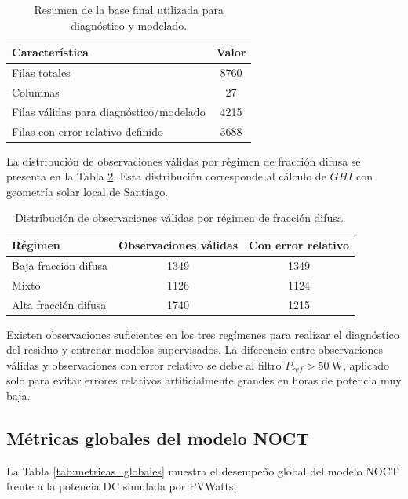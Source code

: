 \documentclass[12pt, letterpaper]{article}
\begin{document}
\begin{table}[H]
\centering
\caption{Resumen de la base final utilizada para diagn\'ostico y modelado.}
\label{tab:base_final}
\begin{tabular}{lc}
\toprule
\textbf{Caracter\'istica} & \textbf{Valor} \\
\midrule
Filas totales & 8760 \\
Columnas & 27 \\
Filas v\'alidas para diagn\'ostico/modelado & 4215 \\
Filas con error relativo definido & 3688 \\
\bottomrule
\end{tabular}
\end{table}

La distribuci\'on de observaciones v\'alidas por r\'egimen de fracci\'on difusa se presenta en la Tabla \ref{tab:regimenes}. Esta distribuci\'on corresponde al c\'alculo de \(GHI\) con geometr\'ia solar local de Santiago.

\begin{table}[H]
\centering
\caption{Distribuci\'on de observaciones v\'alidas por r\'egimen de fracci\'on difusa.}
\label{tab:regimenes}
\begin{tabular}{lcc}
\toprule
\textbf{R\'egimen} & \textbf{Observaciones v\'alidas} & \textbf{Con error relativo} \\
\midrule
Baja fracci\'on difusa & 1349 & 1349 \\
Mixto & 1126 & 1124 \\
Alta fracci\'on difusa & 1740 & 1215 \\
\bottomrule
\end{tabular}
\end{table}

Existen observaciones suficientes en los tres reg\'imenes para realizar el diagn\'ostico del residuo y entrenar modelos supervisados. La diferencia entre observaciones v\'alidas y observaciones con error relativo se debe al filtro \(P_{ref} > \SI{50}{\watt}\), aplicado solo para evitar errores relativos artificialmente grandes en horas de potencia muy baja.

\subsection{M\'etricas globales del modelo NOCT}

La Tabla \ref{tab:metricas_globales} muestra el desempe\~no global del modelo NOCT frente a la potencia DC simulada por PVWatts.
\end{document}
